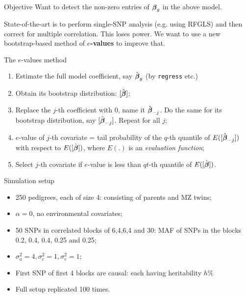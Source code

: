 \documentclass[handout,10pt]{beamer}
\begin{document}
\begin{frame}{Objective}
Want to detect the non-zero entries of ${\boldsymbol{\beta}}_g$ in the above model.

State-of-the-art is to perform single-SNP analysis (e.g. using RFGLS) and then correct for multiple correlation. This loses power. We want to use a new bootstrap-based method of \textbf{$e$-values} to improve that.
\end{frame}

\begin{frame}{The $e$-values method}

\begin{enumerate}
\item Estimate the full model coefficient, say $\hat {{\boldsymbol{\beta}}}_g$ (by \texttt{regress} etc.)

\item Obtain its bootstrap distribution: $[\hat {{\boldsymbol{\beta}}}]$;

\item Replace the $j$-th coefficient with 0, name it $\hat {{\boldsymbol{\beta}}}_{-j}$. Do the same for its bootstrap distribution, say $[\hat {{\boldsymbol{\beta}}}_{-j}]$. Repeat for all $j$;

\item $e$-value of $j$-th covariate = tail probability of the $q$-th quantile of $E([\hat {{\boldsymbol{\beta}}}_{-j}])$ with respect to $E([\hat {{\boldsymbol{\beta}}}])$, where $E(.)$ is an \textit{evaluation function};

\item Select $j$-th covariate if $e$-value is less than $qt$-th quantile of $E([\hat {{\boldsymbol{\beta}}}])$.
\end{enumerate}
\end{frame}

\begin{frame}{Simulation setup}
\begin{itemize}
\item 250 pedigrees, each of size 4: consisting of parents and MZ twins;
\item $\alpha = 0$, no environmental covariates;
\item 50 SNPs in correlated blocks of 6,4,6,4 and 30: MAF of SNPs in the blocks 0.2, 0.4, 0.4, 0.25 and 0.25;
\item $\sigma^2_a = 4, \sigma^2_c = 1, \sigma^2_e = 1$;
\item First SNP of first 4 blocks are causal: each having heritability $h\%$\\

\item Full setup replicated 100 times.
\end{itemize}
\end{frame}
\end{document}
